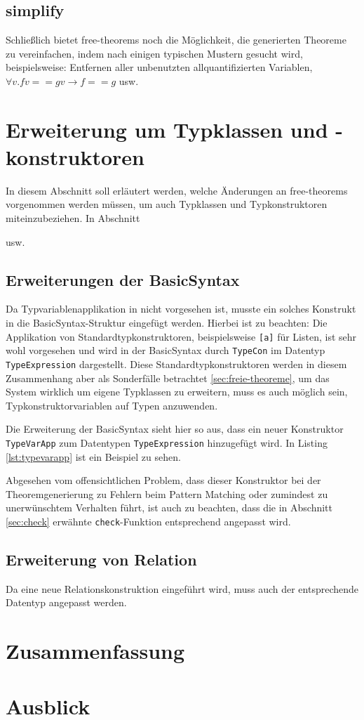 \documentclass[11pt]{article} %
\begin{document}
\subsection{simplify}

Schließlich bietet free-theorems noch die Möglichkeit, die generierten Theoreme zu vereinfachen, indem nach einigen typischen
Mustern gesucht wird, beispielsweise: Entfernen aller unbenutzten allquantifizierten Variablen, $\forall v. f v == g v \rightarrow f == g$ usw.

\section{Erweiterung um Typklassen und -konstruktoren}
\label{sec:erweiterung-typklassen}

In diesem Abschnitt soll erläutert werden, welche Änderungen an free-theorems vorgenommen werden müssen, um auch Typklassen und Typkonstruktoren miteinzubeziehen. In
Abschnitt 

usw.

\subsection{Erweiterungen der BasicSyntax}

Da Typvariablenapplikation in \cite{freetheorems} nicht vorgesehen ist, musste ein solches Konstrukt in die BasicSyntax-Struktur eingefügt werden. Hierbei ist zu beachten: Die Applikation
von Standardtypkonstruktoren, beispielsweise \texttt{[a]} für Listen, ist sehr wohl vorgesehen und wird in der BasicSyntax durch \texttt{TypeCon} im Datentyp \texttt{TypeExpression} dargestellt.  Diese Standardtypkonstruktoren werden in diesem Zusammenhang aber als Sonderfälle betrachtet \ref{sec:freie-theoreme}, um das System wirklich um eigene Typklassen zu erweitern, muss es auch möglich sein, Typkonstruktorvariablen auf Typen anzuwenden.

Die Erweiterung der BasicSyntax sieht hier so aus, dass ein neuer Konstruktor \texttt{TypeVarApp} zum Datentypen \texttt{TypeExpression} hinzugefügt wird. In Listing \ref{lst:typevarapp} ist ein Beispiel zu sehen.



Abgesehen vom offensichtlichen Problem, dass dieser Konstruktor bei der Theoremgenerierung zu Fehlern beim Pattern Matching oder zumindest zu unerwünschtem Verhalten führt,
ist auch zu beachten, dass die in Abschnitt \ref{sec:check} erwähnte \texttt{check}-Funktion entsprechend angepasst wird.

\subsection{Erweiterung von Relation}

Da eine neue Relationskonstruktion eingeführt wird, muss auch der entsprechende Datentyp angepasst werden.

\section{Zusammenfassung}

\section{Ausblick}



\end{document}
